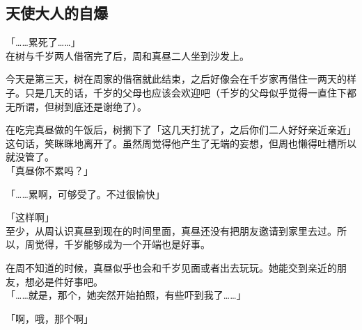 \subsection{天使大人的自爆}

「……累死了……」\\

在树与千岁两人借宿完了后，周和真昼二人坐到沙发上。

今天是第三天，树在周家的借宿就此结束，之后好像会在千岁家再借住一两天的样子。只是几天的话，千岁的父母也应该会欢迎吧（千岁的父母似乎觉得一直住下都无所谓，但树到底还是谢绝了）。

在吃完真昼做的午饭后，树搁下了「这几天打扰了，之后你们二人好好亲近亲近」这句话，笑眯眯地离开了。虽然周觉得他产生了无端的妄想，但周也懒得吐槽所以就没管了。\\

「真昼你不累吗？」

「……累啊，可够受了。不过很愉快」

「这样啊」\\

至少，从周认识真昼到现在的时间里面，真昼还没有把朋友邀请到家里去过。所以，周觉得，千岁能够成为一个开端也是好事。

在周不知道的时候，真昼似乎也会和千岁见面或者出去玩玩。她能交到亲近的朋友，想必是件好事吧。\\

「……就是，那个，她突然开始拍照，有些吓到我了……」

「啊，哦，那个啊」\\

